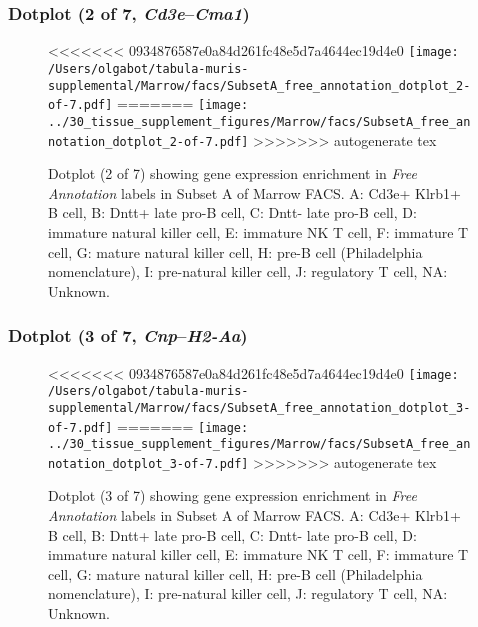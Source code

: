 \subsubsection{Dotplot (2 of 7, \emph{Cd3e}--\emph{Cma1})}
\begin{figure}[h]
\centering
<<<<<<< 0934876587e0a84d261fc48e5d7a4644ec19d4e0
\texttt{[image: /Users/olgabot/tabula-muris-supplemental/Marrow/facs/SubsetA\_free\_annotation\_dotplot\_2-of-7.pdf]}
=======
\texttt{[image: ../30\_tissue\_supplement\_figures/Marrow/facs/SubsetA\_free\_annotation\_dotplot\_2-of-7.pdf]}
>>>>>>> autogenerate tex

\caption{ Dotplot (2 of 7)  showing gene expression enrichment in \emph{Free Annotation} labels in Subset A of Marrow FACS. A: Cd3e+ Klrb1+ B cell, B: Dntt+ late pro-B cell, C: Dntt- late pro-B cell, D: immature natural killer cell, E: immature NK T cell, F: immature T cell, G: mature natural killer cell, H: pre-B cell (Philadelphia nomenclature), I: pre-natural killer cell, J: regulatory T cell, NA: Unknown.}
\end{figure}


\clearpage

\subsubsection{Dotplot (3 of 7, \emph{Cnp}--\emph{H2-Aa})}
\begin{figure}[h]
\centering
<<<<<<< 0934876587e0a84d261fc48e5d7a4644ec19d4e0
\texttt{[image: /Users/olgabot/tabula-muris-supplemental/Marrow/facs/SubsetA\_free\_annotation\_dotplot\_3-of-7.pdf]}
=======
\texttt{[image: ../30\_tissue\_supplement\_figures/Marrow/facs/SubsetA\_free\_annotation\_dotplot\_3-of-7.pdf]}
>>>>>>> autogenerate tex

\caption{ Dotplot (3 of 7)  showing gene expression enrichment in \emph{Free Annotation} labels in Subset A of Marrow FACS. A: Cd3e+ Klrb1+ B cell, B: Dntt+ late pro-B cell, C: Dntt- late pro-B cell, D: immature natural killer cell, E: immature NK T cell, F: immature T cell, G: mature natural killer cell, H: pre-B cell (Philadelphia nomenclature), I: pre-natural killer cell, J: regulatory T cell, NA: Unknown.}
\end{figure}


\clearpage

